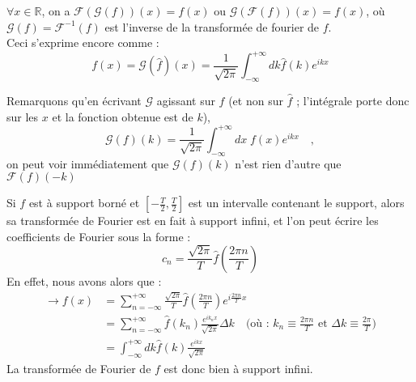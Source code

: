 \documentclass[../notesdecours.tex]{subfiles}
\begin{document}
\begin{theorem} 
    $\forall x \in \mathbb{R}$, on a $\mathcal{F}(\mathcal{G}(f))(x) = f(x)$ ou $\mathcal{G}(\mathcal{F}(f))(x) = f(x)$, 
    où $\mathcal{G}(f) = \mathcal{F}^{-1}(f)$ est l'inverse de la transformée de fourier de $f$. \\
    
    Ceci s'exprime encore comme : 
    \begin{equation}
        f(x) = \mathcal{G}(\hat{f})(x) = \frac{1}{\sqrt{2 \pi}} \int_{-\infty}^{+\infty} dk\hat{f}(k) e^{ikx}
    \end{equation}

    Remarquons qu'en écrivant $\mathcal{G}$ agissant sur $f$ (et non sur $\hat f$ ; l'intégrale porte donc sur les $x$ et la fonction obtenue est de $k$),
    $$\mathcal{G}(f)(k) = \dfrac{1}{\sqrt{2\pi}} \int_{-\infty}^{+\infty} dx \; f(x) e ^{ikx} \quad ,$$
    on peut voir immédiatement que $\mathcal{G}(f)(k)$ n'est rien d'autre que $\mathcal{F}(f)(-k)$
\end{theorem}

\begin{remark}
Si $f$ est à support borné et $ \left[ -\frac{T}{2},\frac{T}{2} \right] $ est un intervalle contenant le support, alors sa transformée de Fourier est 
en fait à support infini, et l'on peut écrire les coefficients de Fourier sous la forme : 
    \begin{equation}
    c_n = \frac{\sqrt{2\pi}}{T}\hat{f} \left( \frac{2\pi n}{T} \right) 
    \end{equation}
En effet, nous avons alors que :
    \begin{align}
\rightarrow f(x) &= \sum_{n = -\infty}^{+\infty} \frac{\sqrt{2\pi}}{T}\hat{f} \left( \frac{2\pi n}{T} \right) e^{i\frac{2\pi n}{T}x}\\
&= \sum_{n = -\infty}^{+\infty} \hat{f}(k_n)\frac{e^{ik_nx}}{\sqrt{2\pi}} \Delta k \quad \mbox{(où : $k_n \equiv \frac{2\pi n}{T}$ et $\Delta k \equiv \frac{2\pi}{T}$)}\\
&= \int_{-\infty}^{+\infty} dk \hat{f}(k) \frac{e^{ikx}}{\sqrt{2\pi}}
    \end{align}
La transformée de Fourier de $f$ est donc bien à support infini. 
\end{remark}
\end{document}

